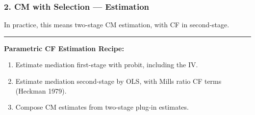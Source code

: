\documentclass[dvipsnames]{beamer} %
\begin{document}
\begin{frame}
    \frametitle{2. CM with Selection --- Estimation}
    In practice, this means two-stage CM estimation, with CF in second-stage.

    \par\noindent\rule{\textwidth}{0.4pt}
    \textbf{Parametric CF Estimation Recipe:}
    \begin{enumerate}
        \item Estimate mediation first-stage with probit, including the IV.
        \item Estimate mediation second-stage by OLS, with Mills ratio CF terms (Heckman 1979).
        \item Compose CM estimates from two-stage plug-in estimates.
    \end{enumerate}

    \vskip0.5cm

    \vfill
\end{frame}
\end{document}
